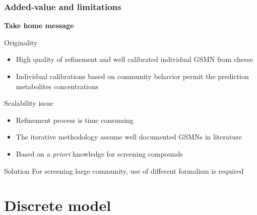 \documentclass[8pt,usenames,dvipsnames]{beamer}
\begin{document}
\begin{frame}
\frametitle{Added-value and limitations}
\centering
\textbf{\huge Take home message}

\begin{minipage}{0.45\textwidth}
\begin{block}{Originality}
\begin{itemize}
\item High quality of refinement and well calibrated individual GSMN from cheese %
\item Individual calibrations based on community behavior permit the prediction metabolites concentrations %
\end{itemize}
\end{block} %
\end{minipage}\hfill
\hspace{0.5cm}
\hfill
\begin{minipage}{0.45\textwidth}
\begin{block}{Scalability issue}
\begin{itemize}
\item Refinement process is time consuming
\item The iterative methodology assume well documented GSMNs in literature
\item Based on \textit{a priori} knowledge for screening compounds
\end{itemize}
\end{block}
\end{minipage}

\begin{block}{Solution}
For screening large community, use of different formalism is required
\end{block}


\end{frame}



\section{Discrete model}
\end{document}
